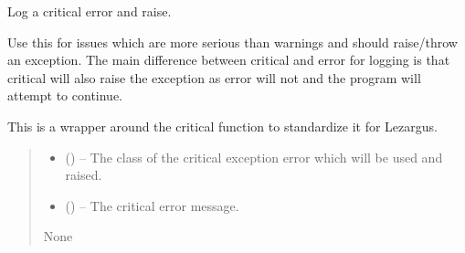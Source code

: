 \documentclass[letterpaper,11pt,english]{sphinxmanual}
\begin{document}

\begin{savenotes}\begin{fulllineitems}
\label{\detokenize{code/lezargus.library.logging:lezargus.library.logging.critical}}
\pysigstartsignatures
{}
\pysigstopsignatures
\sphinxAtStartPar
Log a critical error and raise.

\sphinxAtStartPar
Use this for issues which are more serious than warnings and should
raise/throw an exception. The main difference between critical and error
for logging is that critical will also raise the exception as error will
not and the program will attempt to continue.

\sphinxAtStartPar
This is a wrapper around the critical function to standardize it for
Lezargus.
\begin{quote}\begin{description}
\begin{itemize}
\item {} 
\sphinxAtStartPar
{} ({\hyperref[\detokenize{code/lezargus.library.logging:lezargus.library.logging.LezargusError}]{}}) – The class of the critical exception error which will be used and
raised.

\item {} 
\sphinxAtStartPar
{} () – The critical error message.

\end{itemize}

\sphinxAtStartPar
None

\end{description}\end{quote}

\end{fulllineitems}\end{savenotes}
\end{document}
